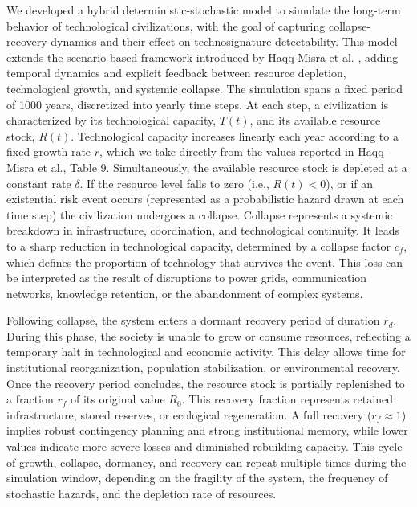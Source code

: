 We developed a hybrid deterministic-stochastic model to simulate the long-term behavior of technological civilizations, with the goal of capturing collapse-recovery dynamics and their effect on technosignature detectability. This model extends the scenario-based framework introduced by Haqq-Misra et al. \citep{Haqq-Misra2025-rt}, adding temporal dynamics and explicit feedback between resource depletion, technological growth, and systemic collapse. The simulation spans a fixed period of 1000 years, discretized into yearly time steps. At each step, a civilization is characterized by its technological capacity, \(T(t)\), and its available resource stock, \(R(t)\). Technological capacity increases linearly each year according to a fixed growth rate \(r\), which we take directly from the values reported in Haqq-Misra et al., Table 9. Simultaneously, the available resource stock is depleted at a constant rate \(\delta\). If the resource level falls to zero (i.e., \(R(t) < 0\)), or if an existential risk event occurs (represented as a probabilistic hazard drawn at each time step) the civilization undergoes a collapse. Collapse represents a systemic breakdown in infrastructure, coordination, and technological continuity. It leads to a sharp reduction in technological capacity, determined by a collapse factor \(c_{f}\), which defines the proportion of technology that survives the event. This loss can be interpreted as the result of disruptions to power grids, communication networks, knowledge retention, or the abandonment of complex systems.

Following collapse, the system enters a dormant recovery period of duration \(r_{d}\). During this phase, the society is unable to grow or consume resources, reflecting a temporary halt in technological and economic activity. This delay allows time for institutional reorganization, population stabilization, or environmental recovery. Once the recovery period concludes, the resource stock is partially replenished to a fraction \(r_{f}\) of its original value \(R_{0}\). This recovery fraction represents retained infrastructure, stored reserves, or ecological regeneration. A full recovery (\(r_{f} \approx 1\)) implies robust contingency planning and strong institutional memory, while lower values indicate more severe losses and diminished rebuilding capacity. This cycle of growth, collapse, dormancy, and recovery can repeat multiple times during the simulation window, depending on the fragility of the system, the frequency of stochastic hazards, and the depletion rate of resources.

